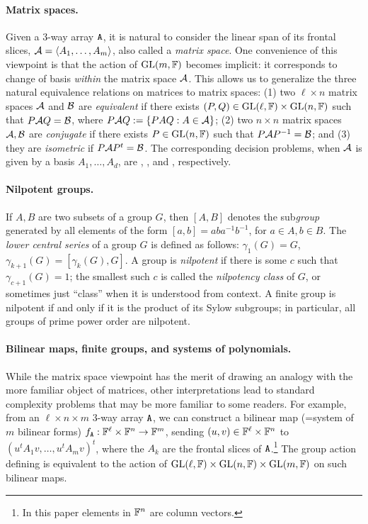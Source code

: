 \paragraph{Matrix spaces.} 
Given a 3-way array $\mathtt{A}$, it is natural to consider the linear span of its frontal slices, $\mathcal{A} = \langle A_1, \dotsc, A_m \rangle$, also called a \emph{matrix space}. 
One convenience of this viewpoint is that the action of $\mathrm{GL}(m,\mathbb{F})$ becomes implicit: it corresponds to 
change of basis \emph{within} the matrix space $\mathcal{A}$. 
This allows us to generalize the three natural equivalence relations on matrices to matrix 
spaces: (1) two $\ell \times n$ matrix spaces $\mathcal{A}$ 
and $\mathcal{B}$ are \emph{equivalent} if there exists $(P, Q) \in \mathrm{GL}(\ell, \mathbb{F}) \times 
\mathrm{GL}(n, \mathbb{F})$ such 
that $P\mathcal{A} Q = \mathcal{B}$, where $P\mathcal{A} Q := \{PA Q : A \in \mathcal{A}\}$; (2) two 
$n \times n$ matrix spaces $\mathcal{A}, \mathcal{B}$ are \emph{conjugate} if there exists $P \in 
\mathrm{GL}(n, \mathbb{F})$ such that $P \mathcal{A} P^{-1} = \mathcal{B}$; and (3) they are \emph{isometric} if 
$P \mathcal{A} 
P^t = \mathcal{B}$. The corresponding decision problems, when $\mathcal{A}$ is 
given by a basis $A_1, \dotsc, A_d$, are \MatSpEquivlong, \MatSpConjlong, 
and \MatSpIsomlong, respectively. 

\paragraph{Nilpotent groups.} If $A,B$ are two subsets of a group $G$, then 
$[A,B]$ 
denotes the sub\emph{group} generated by all elements of the form $[a,b] = 
aba^{-1}b^{-1}$, for $a \in A, b \in B$. The \emph{lower central series} of a 
group $G$ is defined as follows: $\gamma_1(G) = G$, $\gamma_{k+1}(G) = 
[\gamma_k(G), G]$. A group is \emph{nilpotent} if there is some $c$ such that 
$\gamma_{c+1}(G) = 1$; the smallest such $c$ is called the \emph{nilpotency class} 
of $G$, or sometimes just ``class'' when it is understood from context. A finite 
group is nilpotent if and only if it is the product of its Sylow subgroups; in 
particular, all groups of prime power order are nilpotent.

\paragraph{Bilinear maps, finite groups, and systems of polynomials.} 
While the 
matrix 
space viewpoint has the merit of 
drawing an analogy with the more familiar object of matrices, other interpretations 
lead to standard complexity problems that may be more familiar to some readers. 
For example, from an $\ell \times n \times m$ 3-way array $\mathtt{A}$, we can construct 
a bilinear map (=system of $m$ bilinear forms) $f_{\mathtt{A}}:\mathbb{F}^\ell\times\mathbb{F}^n\to\mathbb{F}^m$, 
sending $(u, v)\in \mathbb{F}^\ell\times 
\mathbb{F}^n$ to $(u^t A_1 v, \dots, u^tA_m v)^t$, where the $A_k$ are the frontal slices of $\mathtt{A}$.\footnote{In this paper elements in $\mathbb{F}^n$ are column vectors.} 
The group action defining \MatSpEquivlong 
is equivalent to the action 
of $\mathrm{GL}(\ell, \mathbb{F})\times\mathrm{GL}(n, \mathbb{F})\times \mathrm{GL}(m, \mathbb{F})$ on such bilinear maps.  


